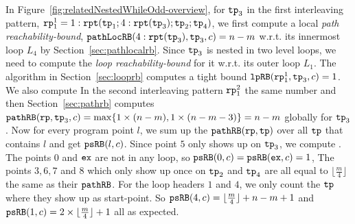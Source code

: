 In Figure~\ref{fig:relatedNestedWhileOdd-overview}, for $\mathtt{tp}_3$ in the first interleaving pattern, $\mathtt{rp}_1^1 = 1: \mathtt{rpt}(\mathtt{tp}_1; 4:\mathtt{rpt}(\mathtt{tp}_3); \mathtt{tp}_2; \mathtt{tp}_4)$, 
we first compute a local \emph{path reachability-bound}, $\mathtt{pathLocRB}(4:\mathtt{rpt}(\mathtt{tp}_3), \mathtt{tp}_3, c) = n - m$
w.r.t. its innermost loop $L_4$  by Section~\ref{sec:pathlocalrb}.
Since $\mathtt{tp}_3$ is nested in two level loops, we need to compute the \emph{loop reachability-bound} for it
w.r.t. its outer loop $L_1$. The algorithm in Section~\ref{sec:looprb} computes a tight bound $\mathtt{lpRB}(\mathtt{rp}_1^1, \mathtt{tp}_3, c) = 1$. We also compute In the second interleaving pattern $\mathtt{rp}_1^2$ the same number and
then
Section~\ref{sec:pathrb} computes $\mathtt{pathRB}(\mathtt{rp}, \mathtt{tp}_3, c) = \max\{ 1 \times (n - m), 1 \times (n - m - 3) \} = n - m$ globally for $\mathtt{tp}_3$.
%
Now for every program point $l$, we sum up the $\mathtt{pathRB}(\mathtt{rp}, \mathtt{tp})$ over all $\mathtt{tp}$ that contains $l$ and get $\mathtt{psRB}(l, c)$.
Since point $5$ only shows up on $\mathtt{tp}_3$, we compute .
The points $0$ and $\mathtt{ex}$ are not in any loop, so $\mathtt{psRB}(0, c) = \mathtt{psRB}(\mathtt{ex}, c) = 1$,
The points $3, 6, 7$ and $8$ which only show up once on $\mathtt{tp}_2$ and $\mathtt{tp}_4$ are all equal to $\lfloor\frac{m}{4}\rfloor$ the same as their $\mathtt{pathRB}$.
For the loop headers $1$ and $4$, we only count the $\mathtt{tp}$ where they show up as start-point.
So $\mathtt{psRB}(4, c) =  \lfloor\frac{m}{4}\rfloor + n - m + 1$ and $\mathtt{psRB}(1,c) = 2 \times \lfloor\frac{m}{4}\rfloor + 1$ all as expected.